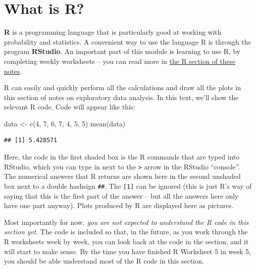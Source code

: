 \documentclass[
  a4paper,
]{book}
\newenvironment{Shaded}{\begin{snugshade}}{\end{snugshade}}
\newcommand{\DecValTok}[1]{\textcolor[rgb]{0.00,0.00,0.81}{#1}}
\newcommand{\FunctionTok}[1]{\textcolor[rgb]{0.00,0.00,0.00}{#1}}
\newcommand{\NormalTok}[1]{#1}
\newcommand{\OtherTok}[1]{\textcolor[rgb]{0.56,0.35,0.01}{#1}}
\theoremstyle{definition}
\theoremstyle{definition}
\theoremstyle{definition}
\theoremstyle{definition}
\theoremstyle{remark}
\begin{document}
\hypertarget{what-is-R}{%
\section{What is R?}\label{what-is-R}}

\textbf{R} is a programming language that is particularly good at working with probability and statistics. A convenient way to use the language R is through the program \textbf{RStudio}. An important part of this module is learning to use R, by completing weekly worksheets -- you can read more in \protect\hyperlink{R}{the R section of these notes}.

R can easily and quickly perform all the calculations and draw all the plots in this section of notes on exploratory data analysis. In this text, we'll show the relevant R code. Code will appear like this:

\begin{Shaded}
\begin{Highlighting}[]
\NormalTok{data }\OtherTok{\textless{}{-}} \FunctionTok{c}\NormalTok{(}\DecValTok{4}\NormalTok{, }\DecValTok{7}\NormalTok{, }\DecValTok{6}\NormalTok{, }\DecValTok{7}\NormalTok{, }\DecValTok{4}\NormalTok{, }\DecValTok{5}\NormalTok{, }\DecValTok{5}\NormalTok{)}
\FunctionTok{mean}\NormalTok{(data)}
\end{Highlighting}
\end{Shaded}

\begin{verbatim}
## [1] 5.428571
\end{verbatim}

Here, the code in the first shaded box is the R commands that are typed into
RStudio, which you can type in next to the \texttt{\textgreater{}} arrow in the RStudio ``console''. The numerical answers that R returns are shown here in the second unshaded box next to a double hashsign \texttt{\#\#}. The \texttt{{[}1{]}} can be ignored (this is just R's way of saying that this is the first part of the answer -- but all the answers here only have one part anyway). Plots produced by R are displayed here as pictures.

Most importantly for now, \emph{you are not expected to understand the R code in this section yet}. The code is included so that, in the future, as you work through the R worksheets week by week, you can look back at the code in the section, and it will start to make sense. By the time you have finished R Worksheet 5 in week 5, you should be able understand most of the R code in this section.
\end{document}
